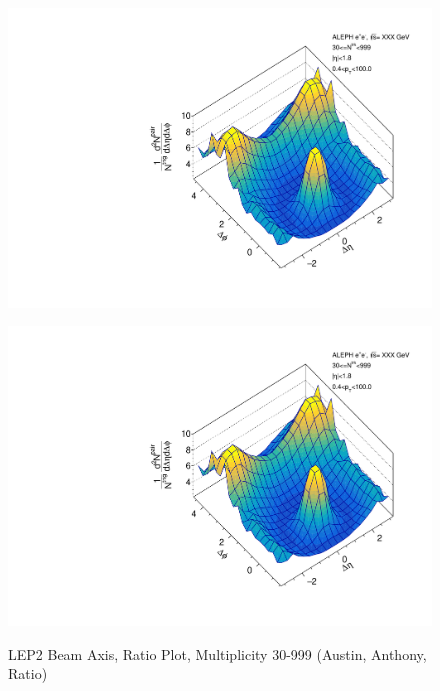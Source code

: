 \begin{figure}[htbp]
  \caption{LEP2 Beam Axis, Ratio Plot, Multiplicity 30-999 (Austin, Anthony, Ratio)}
  \begin{minipage}[b]{0.32\linewidth}
    \centering
    \includegraphics[width=\linewidth]{images/TwoParticleCorrelation/LEP2_BEAM/LEP2_BEAM_ratio1_30_999.pdf}
    \label{fig:LEP2 Beam Axis, Ratio Plot, Multiplicity 30-999, Austin}
  \end{minipage}
  \hspace{0.0cm}
  \begin{minipage}[b]{0.32\linewidth}
    \centering
    \includegraphics[width=\linewidth]{images/TwoParticleCorrelation/LEP2_BEAM/LEP2_BEAM_ratio2_30_999.pdf}
    \label{fig:LEP2 Beam Axis, Ratio Plot, Multiplicity 30-999, Anthony}

\end{minipage}
\end{figure}
